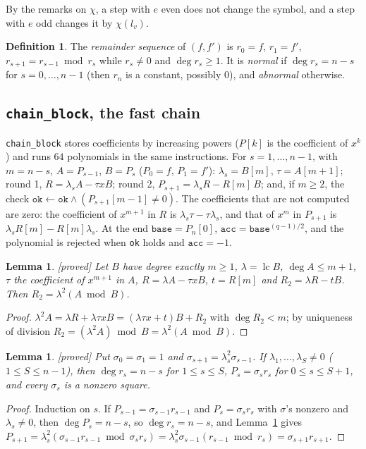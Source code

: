 \documentclass[10pt,a4paper]{article}
\DeclareMathOperator{\lc}{lc}
\newcommand{\code}[1]{\texttt{#1}}
\newcommand{\stproved}{\textsf{\small[proved]}\xspace}
\theoremstyle{plain}
\newtheorem{lemma}[proposition]{Lemma}
\theoremstyle{definition}
\newtheorem{definition}[proposition]{Definition}
\begin{document}
By the remarks on $\chi$, a step with $e$ even does not change the symbol, and a step with $e$ odd changes it by $\chi(l_v)$.

\begin{definition}
The \emph{remainder sequence} of $(f,f')$ is $r_0=f$, $r_1=f'$, $r_{s+1}=r_{s-1}\bmod r_s$ while $r_s\neq0$ and $\deg r_s\ge1$.  It is \emph{normal} if
$\deg r_s=n-s$ for $s=0,\dots,n-1$ (then $r_n$ is a constant, possibly $0$), and \emph{abnormal} otherwise.
\end{definition}

\subsection{\code{chain\_block}, the fast chain}

\code{chain\_block} stores coefficients by increasing powers ($P[k]$ is the coefficient of $x^k$) and runs $64$ polynomials in the same instructions.  For
$s=1,\dots,n-1$, with $m=n-s$, $A=P_{s-1}$, $B=P_s$ ($P_0=f$, $P_1=f'$): $\lambda_s=B[m]$, $\tau=A[m+1]$; round 1, $R=\lambda_sA-\tau xB$; round 2,
$P_{s+1}=\lambda_sR-R[m]\,B$; and, if $m\ge2$, the check $\code{ok}\leftarrow\code{ok}\wedge(P_{s+1}[m-1]\neq0)$.  The coefficients that are not computed are zero:
the coefficient of $x^{m+1}$ in $R$ is $\lambda_s\tau-\tau\lambda_s$, and that of $x^m$ in $P_{s+1}$ is $\lambda_sR[m]-R[m]\lambda_s$.  At the end
$\code{base}=P_n[0]$, $\code{acc}=\code{base}^{(q-1)/2}$, and the polynomial is rejected when \code{ok} holds and $\code{acc}=-1$.

\begin{lemma}\label{lem:L2}\stproved
Let $B$ have degree exactly $m\ge1$, $\lambda=\lc B$, $\deg A\le m+1$, $\tau$ the coefficient of $x^{m+1}$ in $A$, $R=\lambda A-\tau xB$, $t=R[m]$ and
$R_2=\lambda R-tB$.  Then $R_2=\lambda^2(A\bmod B)$.
\end{lemma}
\begin{proof}
$\lambda^2A=\lambda R+\lambda\tau xB=(\lambda\tau x+t)B+R_2$ with $\deg R_2<m$; by uniqueness of division $R_2=(\lambda^2A)\bmod B=\lambda^2(A\bmod B)$.
\end{proof}

\begin{lemma}\label{lem:sigma}\stproved
Put $\sigma_0=\sigma_1=1$ and $\sigma_{s+1}=\lambda_s^2\sigma_{s-1}$.  If $\lambda_1,\dots,\lambda_S\neq0$ ($1\le S\le n-1$), then $\deg r_s=n-s$ for $1\le s\le S$,
$P_s=\sigma_sr_s$ for $0\le s\le S+1$, and every $\sigma_s$ is a nonzero square.
\end{lemma}
\begin{proof}
Induction on $s$.  If $P_{s-1}=\sigma_{s-1}r_{s-1}$ and $P_s=\sigma_sr_s$ with $\sigma$'s nonzero and $\lambda_s\neq0$, then $\deg P_s=n-s$, so $\deg r_s=n-s$, and
Lemma~\ref{lem:L2} gives $P_{s+1}=\lambda_s^2(\sigma_{s-1}r_{s-1}\bmod\sigma_sr_s)=\lambda_s^2\sigma_{s-1}(r_{s-1}\bmod r_s)=\sigma_{s+1}r_{s+1}$.
\end{proof}
\end{document}
